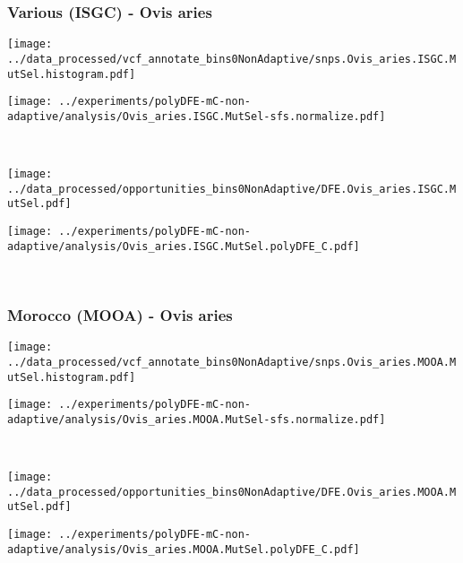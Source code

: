 \subsubsection{Various (ISGC) - Ovis aries}

\begin{minipage}{0.49\linewidth}
    \texttt{[image: ../data\_processed/vcf\_annotate\_bins0NonAdaptive/snps.Ovis\_aries.ISGC.MutSel.histogram.pdf]}
\end{minipage}
\begin{minipage}{0.49\linewidth}
    \texttt{[image: ../experiments/polyDFE-mC-non-adaptive/analysis/Ovis\_aries.ISGC.MutSel-sfs.normalize.pdf]}
\end{minipage}
\\
\begin{minipage}{0.49\linewidth}
    \texttt{[image: ../data\_processed/opportunities\_bins0NonAdaptive/DFE.Ovis\_aries.ISGC.MutSel.pdf]}
\end{minipage}
\begin{minipage}{0.49\linewidth}
    \texttt{[image: ../experiments/polyDFE-mC-non-adaptive/analysis/Ovis\_aries.ISGC.MutSel.polyDFE\_C.pdf]}
\end{minipage}
\\

\subsubsection{Morocco (MOOA) - Ovis aries}

\begin{minipage}{0.49\linewidth}
    \texttt{[image: ../data\_processed/vcf\_annotate\_bins0NonAdaptive/snps.Ovis\_aries.MOOA.MutSel.histogram.pdf]}
\end{minipage}
\begin{minipage}{0.49\linewidth}
    \texttt{[image: ../experiments/polyDFE-mC-non-adaptive/analysis/Ovis\_aries.MOOA.MutSel-sfs.normalize.pdf]}
\end{minipage}
\\
\begin{minipage}{0.49\linewidth}
    \texttt{[image: ../data\_processed/opportunities\_bins0NonAdaptive/DFE.Ovis\_aries.MOOA.MutSel.pdf]}
\end{minipage}
\begin{minipage}{0.49\linewidth}
    \texttt{[image: ../experiments/polyDFE-mC-non-adaptive/analysis/Ovis\_aries.MOOA.MutSel.polyDFE\_C.pdf]}
\end{minipage}
\\
